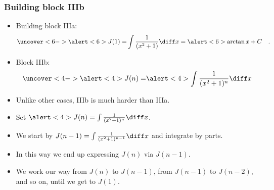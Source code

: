 \begin{frame}
\frametitle{Building block IIIb}
\begin{itemize}
\item<1-> Building block IIIa: 
\[
\uncover<6->{\alert<6>{J(1)=}} \int \frac{1}{(x^2+1)}\diff x=\alert<6>{\arctan x+C}\quad .
\] 
\item<2-> Block IIIb:
\[
\uncover<4->{\alert<4>{J(n)=}} \alert<4>{\int \frac{1}{(x^2+1)^n}\diff x}
\] 
\item<3-> Unlike other cases, IIIb is much harder than IIIa.
\item<4-> Set $\alert<4>{J(n)=\int \frac{1}{(x^2+1)^n}\diff x}$.  
\item<7-> We start by $J(n-1) =\int \frac{1}{(x^2+1)^{n-1}} \diff x$ and integrate by parts.
\item<8-> In this way we end up expressing $J(n)$ via $J(n-1)$.
\item<9-> We work our way from $J(n)$ to $J(n-1)$, from $J(n-1)$ to $J(n-2)$, and so on, until we get to $J(1)$.
\end{itemize} 
\end{frame}

